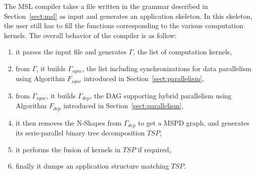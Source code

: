 


The MSL compiler takes a file written in the grammar described in Section~\ref{sect:msl} as input and generates an application skeleton.
In this skeleton, the user still has to fill the functions corresponding to the various computation kernels.
The overall behavior of the compiler is as follow: %
\begin{enumerate}
 \item it parses the input file and generates $\Gamma$, the list of computation kernels,
 \item from $\Gamma$, it builds $\Gamma_{sync}$, the list including synchronizations for data parallelism using Algorithm $F_{sync}$ introduced in Section~\ref{sect:parallelism},
 \item from $\Gamma_{sync}$, it builds $\Gamma_{dep}$, the DAG supporting hybrid parallelism using Algorithm $F_{dep}$ introduced in Section~\ref{sect:parallelism},
 \item it then removes the N-Shapes from $\Gamma_{dep}$ to get a MSPD graph, and generates its serie-parallel binary tree decomposition $TSP$,
 \item it performs the fusion of kernels in $TSP$ if required,
 \item finally it dumps an application structure matching $TSP$.
\end{enumerate}


